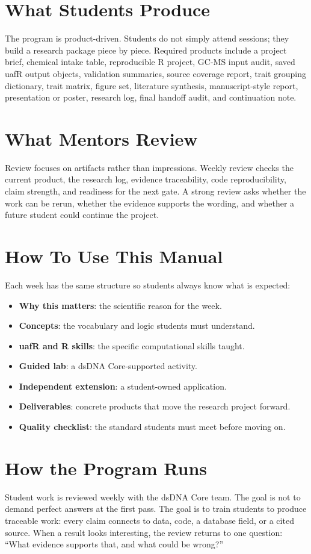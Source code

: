 \section*{What Students Produce}
The program is product-driven. Students do not simply attend sessions; they build a research package piece by piece. Required products include a project brief, chemical intake table, reproducible R project, GC-MS input audit, saved uafR output objects, validation summaries, source coverage report, trait grouping dictionary, trait matrix, figure set, literature synthesis, manuscript-style report, presentation or poster, research log, final handoff audit, and continuation note.

\section*{What Mentors Review}
Review focuses on artifacts rather than impressions. Weekly review checks the current product, the research log, evidence traceability, code reproducibility, claim strength, and readiness for the next gate. A strong review asks whether the work can be rerun, whether the evidence supports the wording, and whether a future student could continue the project.

\section*{How To Use This Manual}
Each week has the same structure so students always know what is expected:
\begin{itemize}
  \item \textbf{Why this matters}: the scientific reason for the week.
  \item \textbf{Concepts}: the vocabulary and logic students must understand.
  \item \textbf{uafR and R skills}: the specific computational skills taught.
  \item \textbf{Guided lab}: a dsDNA Core-supported activity.
  \item \textbf{Independent extension}: a student-owned application.
  \item \textbf{Deliverables}: concrete products that move the research project forward.
  \item \textbf{Quality checklist}: the standard students must meet before moving on.
\end{itemize}

\section*{How the Program Runs}
Student work is reviewed weekly with the dsDNA Core team. The goal is not to demand perfect answers at the first pass. The goal is to train students to produce traceable work: every claim connects to data, code, a database field, or a cited source. When a result looks interesting, the review returns to one question: ``What evidence supports that, and what could be wrong?''

